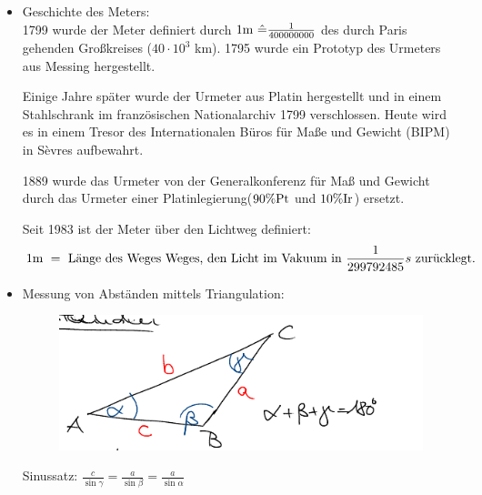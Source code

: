\begin{Beispiel}
\begin{itemize}
\item Geschichte des Meters:\\
1799 wurde der Meter definiert durch $1 \text{m } \hat = \frac{1}{400000000}$ des durch Paris gehenden Großkreises ($40\cdot 10^3$ km). 1795 wurde ein Prototyp des Urmeters aus Messing hergestellt.

Einige Jahre später wurde der Urmeter aus Platin hergestellt und in einem Stahlschrank im französischen Nationalarchiv 1799 verschlossen. Heute wird es in einem Tresor des Internationalen Büros für Maße und Gewicht (BIPM) in S\`evres aufbewahrt.

1889 wurde das Urmeter von der Generalkonferenz für Maß und Gewicht durch das Urmeter einer Platinlegierung($90\% \ce{Pt}$ und $10\% \ce{Ir}$) ersetzt.

 Seit 1983 ist der Meter über den Lichtweg definiert:
 \[
  1\text{m }=\text{ Länge des Weges Weges, den Licht im Vakuum in $\frac{1}{299792485} s$ zurücklegt.}
 \]

\item Messung von Abständen mittels Triangulation:\\
 \begin{figure}[!ht]
  \includegraphics[scale=0.5]{bilder/fig7}
 \end{figure}
 Sinussatz: $\frac{c}{\sin\gamma} = \frac{a}{\sin{\beta}}=\frac{a}{\sin\alpha}$ \\
 

\end{itemize}
\end{Beispiel}
